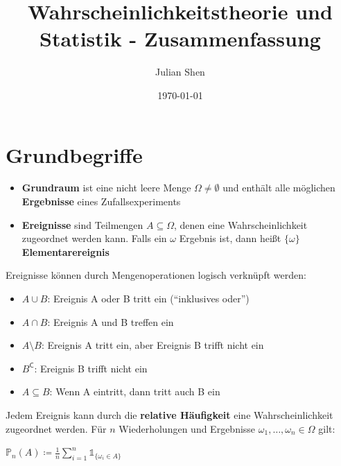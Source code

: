 \documentclass[parskip=full,12pt,a4paper,titlepage]{scrartcl}
\title{Wahrscheinlichkeitstheorie und Statistik - Zusammenfassung}
\author{Julian Shen}
\date{\today}
\newcommand{\PP}{\mathbb{P}}
\newenvironment{tightcenter}{%
	\setlength\topsep{0pt}
	\setlength\parskip{0pt}
	\begin{center}
	}{%
	\end{center}
}
\begin{document}
	\maketitle
	\pagebreak
	
	\section{Grundbegriffe}
	\begin{itemize}
		\item \textbf{Grundraum} ist eine nicht leere Menge $\Omega\neq\emptyset$ und enthält alle möglichen \textbf{Ergebnisse} eines Zufallsexperiments
		\item \textbf{Ereignisse} sind Teilmengen $A\subseteq\Omega$, denen eine Wahrscheinlichkeit zugeordnet werden kann. 
		Falls ein $\omega$ Ergebnis ist, dann heißt $\{\omega\}$ \textbf{Elementarereignis}
	\end{itemize}
	Ereignisse können durch Mengenoperationen logisch verknüpft werden:
	\begin{itemize}
		\item $A\cup B$: Ereignis A oder B tritt ein (\enquote{inklusives oder})
		\item $A\cap B$: Ereignis A und B treffen ein
		\item $A\setminus B$: Ereignis A tritt ein, aber Ereignis B trifft nicht ein
		\item $B^{\mathsf{C}}$: Ereignis B trifft nicht ein
		\item $A\subseteq B$: Wenn A eintritt, dann tritt auch B ein
	\end{itemize}
	Jedem Ereignis kann durch die \textbf{relative Häufigkeit} eine Wahrscheinlichkeit zugeordnet werden. 
	Für $n$ Wiederholungen und Ergebnisse $\omega_1,\ldots,\omega_n\in\Omega$ gilt:\\
	\begin{tightcenter}
		$\PP_n(A)\coloneqq\frac{1}{n}\sum\limits_{i=1}^{n} \mathds{1}_{\{\omega_i \in A\}}$
	\end{tightcenter}
	
\end{document}
